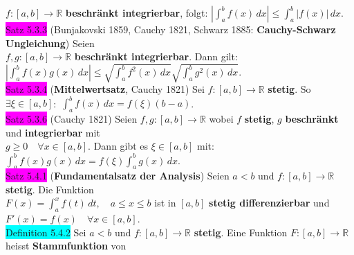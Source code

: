 \documentclass[10pt]{article}
\begin{document}
                \textcolor{NavyBlue}{$f:[a,b]\longrightarrow\mathbb{R}$} 
                \textbf{beschränkt integrierbar}, folgt: 
                \textcolor{NavyBlue}{$|\int_a^bf(x)\,dx|\leqslant\int_a^b|f(x)|\,dx$}.\\
\colorbox{magenta}{Satz 5.3.3} (Bunjakovski 1859, Cauchy 1821, 
                Schwarz 1885: \textbf{Cauchy-Schwarz Ungleichung}) 
                Seien \\
        \indent \textcolor{NavyBlue}{$f,g:[a,b]\longrightarrow\mathbb{R}$}
                \textbf{beschränkt integrierbar}. Dann gilt: 
                \textcolor{NavyBlue}{$|\int_a^bf(x)g(x)\,dx|
                \leqslant\sqrt{\int_a^bf^2(x)\,dx}\sqrt{\int_a^bg^2(x)\,dx}$}.\\
\colorbox{magenta}{Satz 5.3.4} (\textbf{Mittelwertsatz}, Cauchy 1821) Sei 
                \textcolor{NavyBlue}{$f:[a,b]\longrightarrow\mathbb{R}$} \textbf{stetig}.
                So \textcolor{NavyBlue}{$\exists\xi\in[a,b]$}:\, 
                \textcolor{NavyBlue}{$\int_a^bf(x)\,dx=f(\xi)(b-a)$}.\\
\colorbox{magenta}{Satz 5.3.6} (Cauchy 1821) Seien 
                \textcolor{NavyBlue}{$f,g:[a,b]\longrightarrow\mathbb{R}$} wobei 
                \textcolor{NavyBlue}{$f$} \textbf{stetig}, 
                \textcolor{NavyBlue}{$g$} \textbf{beschränkt} und \textbf{integrierbar} mit \\
        \indent \textcolor{NavyBlue}{$g\geqslant0\quad\forall x\in[a,b]$}. Dann gibt es 
                \textcolor{NavyBlue}{$\xi\in[a,b]$} mit: 
                \textcolor{NavyBlue}{$\int_a^bf(x)g(x)\,dx=f(\xi)\int_a^bg(x)\,dx$}. \\
\colorbox{magenta}{Satz 5.4.1} (\textbf{Fundamentalsatz der Analysis}) 
                Seien \textcolor{NavyBlue}{$a<b$} und 
                \textcolor{NavyBlue}{$f:[a,b]\longrightarrow\mathbb{R}$} 
                \textbf{stetig}. Die Funktion \\
        \indent \textcolor{NavyBlue}{$F(x)=\int_a^xf(t)\,dt,\quad a\leqslant x\leqslant b$} 
                ist in \textcolor{NavyBlue}{$[a,b]$} \textbf{stetig differenzierbar} 
                und \textcolor{NavyBlue}{$F'(x)=f(x)\quad\forall x\in[a,b]$}.\\
\colorbox{cyan}{Definition 5.4.2} Sei \textcolor{NavyBlue}{$a<b$} und 
                \textcolor{NavyBlue}{$f:[a,b]\longrightarrow\mathbb{R}$} \textbf{stetig}. 
                Eine Funktion 
                \textcolor{NavyBlue}{$F:[a,b]\longrightarrow\mathbb{R}$} heisst 
                \textbf{Stammfunktion} von \\
\end{document}
